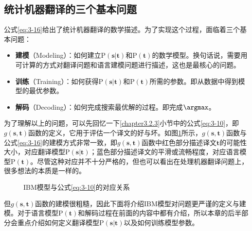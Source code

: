\subsection{统计机器翻译的三个基本问题}

\parinterval 公式\ref{eq:3-16}给出了统计机器翻译的数学描述。为了实现这个过程，面临着三个基本问题：

\begin{itemize}
\vspace{0.5em}
\item {\small\sffamily\bfseries{建模}}（Modeling）：如何建立$\textrm{P}(\mathbf{s}|\mathbf{t})$和$\textrm{P}(\mathbf{t})$的数学模型。换句话说，需要用可计算的方式对翻译问题和语言建模问题进行描述，这也是最核心的问题。
\vspace{0.5em}
\item {\small\sffamily\bfseries{训练}}（Training）：如何获得$\textrm{P}(\mathbf{s}|\mathbf{t})$和$\textrm{P}(\mathbf{t})$所需的参数。即从数据中得到模型的最优参数。
\vspace{0.5em}
\item {\small\sffamily\bfseries{解码}}（Decoding）：如何完成搜索最优解的过程。即完成$\argmax$。
\vspace{0.5em}
\end{itemize}

\parinterval 为了理解以上的问题，可以先回忆一下\ref{chapter3.2.3}小节中的公式\ref{eq:3-10}，即$g(\mathbf{s},\mathbf{t})$函数的定义，它用于评估一个译文的好与坏。如图\ref{fig:3-14}所示，$g(\mathbf{s},\mathbf{t})$函数与公式\ref{eq:3-16}的建模方式非常一致，即$g(\mathbf{s},\mathbf{t})$函数中红色部分描述译文$\mathbf{t}$的可能性大小，对应翻译模型$\textrm{P}(\mathbf{s}|\mathbf{t})$；蓝色部分描述译文的平滑或流畅程度，对应语言模型$\textrm{P}(\mathbf{t})$。尽管这种对应并不十分严格的，但也可以看出在处理机器翻译问题上，很多想法的本质是一样的。

\begin{figure}[htp]
    \centering

    \caption{IBM模型与公式\ref{eq:3-10}的对应关系}
    \label{fig:3-14}
\end{figure}

\parinterval 但$g(\mathbf{s},\mathbf{t})$函数的建模很粗糙，因此下面将介绍IBM模型对问题更严谨的定义与建模。对于语言模型$\textrm{P}(\mathbf{t})$和解码过程在前面的内容中都有介绍，所以本章的后半部分会重点介绍如何定义翻译模型$\textrm{P}(\mathbf{s}|\mathbf{t})$以及如何训练模型参数。

